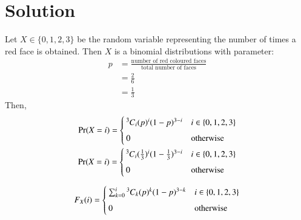 \documentclass[journal,12pt,twocolumn]{IEEEtran}
\begin{document}
\section*{Solution}
Let $X \in \{ 0, 1, 2, 3\}$ be the random variable representing the number of times a red face is obtained. Then $X$ is a binomial distributions with parameter:
\begin{align}
    p &= \frac{\text{number of red coloured faces}}{\text{total number of faces}}
    \\ &= \frac{2}{6}
    \\ &= \frac{1}{3}
\end{align}
Then,
\begin{align}
    \Pr(X=i) = 
	\begin{cases}
	\comb[3]{i}(p)^i(1-p)^{3-i} &  i \in \{0, 1, 2, 3\}\\ ~\\[-1em]
	0 & \text{otherwise}
	\end{cases}
	\\\Pr(X=i) = 
	\begin{cases}
	\comb[3]{i}(\frac{1}{3})^i(1-\frac{1}{3})^{3-i}  &  i \in \{0, 1, 2, 3\}\\ ~\\[-1em]
	0 & \text{otherwise}
	\end{cases}
\end{align}
\begin{center}
\begin{table}[h]
    \centering
    \caption{PMF of X}
    \label{table 1}
\end{table}
\end{center}
\begin{align}
    F_X(i) = 
	\begin{cases}
	\sum_{k=0}^i\comb[3]{k}(p)^k(1-p)^{3-k} &  i \in \{0, 1, 2, 3\}\\ ~\\[-1em]
	0 & \text{otherwise}
	\end{cases}
\end{align}
\end{document}
